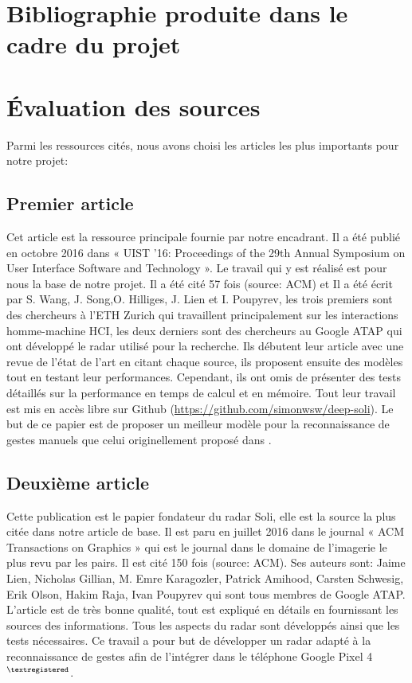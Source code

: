 \documentclass[12pt]{article}
\begin{document}
\section{Bibliographie produite dans le cadre du projet}
 \nocite{*}
\printbibliography[heading=none]
\newpage
\section{Évaluation des sources}
Parmi les ressources cités, nous avons choisi les articles les plus importants pour notre
projet:

\subsection{Premier article \cite{Wang2016}}
Cet article est la ressource principale fournie par notre encadrant. Il a été publié en octobre 2016 dans « UIST '16: Proceedings of the 29th Annual Symposium on User Interface Software and Technology ». Le travail qui y est réalisé est pour nous la base de notre projet. Il a été cité 57 fois (source: ACM) et Il a été écrit par S. Wang, J. Song,O. Hilliges, J. Lien et I. Poupyrev, les trois premiers sont des chercheurs à l’ETH Zurich qui travaillent principalement sur les interactions homme-machine HCI, les deux derniers sont des chercheurs au Google ATAP qui ont développé le radar utilisé pour la recherche. Ils débutent leur article avec une revue de l’état de l’art en citant chaque source, ils proposent ensuite des modèles tout en testant leur performances. Cependant,  ils ont omis de présenter des tests détaillés sur la performance en temps de calcul et en mémoire. Tout leur travail est mis en accès libre sur Github (\url{https://github.com/simonwsw/deep-soli}). Le but de ce papier est de proposer un meilleur modèle pour la reconnaissance de gestes manuels que celui originellement proposé dans \cite{Lien2016}.


\subsection{Deuxième article \cite{Lien2016}}
Cette publication est le papier fondateur du radar Soli, elle est la source la plus citée dans notre article de base. Il est paru en juillet 2016 dans le journal « ACM Transactions on Graphics » qui est le journal dans le domaine de l’imagerie le plus revu par les pairs. Il est cité 150 fois (source: ACM). Ses auteurs sont: Jaime Lien, Nicholas Gillian, M. Emre Karagozler, Patrick Amihood, Carsten Schwesig, Erik Olson, Hakim Raja, Ivan Poupyrev qui sont tous membres de Google ATAP. L’article est de très bonne qualité, tout est expliqué en détails en fournissant les sources des informations. Tous les aspects du radar sont développés ainsi que les tests nécessaires. Ce travail a pour but de développer un radar adapté à la reconnaissance de gestes afin de l’intégrer dans le téléphone Google Pixel 4$^{\tiny{\textregistered}}$.
\end{document}
